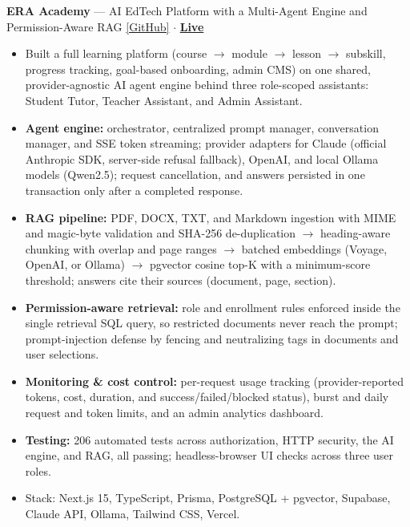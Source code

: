 \documentclass[11pt,a4paper]{article}
\begin{document}
\textbf{ERA Academy} --- AI EdTech Platform with a Multi-Agent Engine and Permission-Aware RAG \hfill \href{https://github.com/malikov-davronbek/ERA/tree/phase-1-foundation}{[GitHub]} $\cdot$ {\large\textbf{\href{https://era-academy.vercel.app}{Live}}}
\begin{itemize}
    \item Built a full learning platform (course $\rightarrow$ module $\rightarrow$ lesson $\rightarrow$ subskill, progress
tracking, goal-based onboarding, admin CMS) on one shared, provider-agnostic AI agent engine behind three
role-scoped assistants: Student Tutor, Teacher Assistant, and Admin Assistant.
    \item \textbf{Agent engine:} orchestrator, centralized prompt manager, conversation manager, and SSE token streaming;
provider adapters for Claude (official Anthropic SDK, server-side refusal fallback), OpenAI, and local Ollama models
(Qwen2.5); request cancellation, and answers persisted in one transaction only after a completed response.
    \item \textbf{RAG pipeline:} PDF, DOCX, TXT, and Markdown ingestion with MIME and magic-byte validation and SHA-256
de-duplication $\rightarrow$ heading-aware chunking with overlap and page ranges $\rightarrow$ batched embeddings
(Voyage, OpenAI, or Ollama) $\rightarrow$ pgvector cosine top-K with a minimum-score threshold; answers cite their
sources (document, page, section).
    \item \textbf{Permission-aware retrieval:} role and enrollment rules enforced inside the single retrieval SQL query, so
restricted documents never reach the prompt; prompt-injection defense by fencing and neutralizing tags in documents
and user selections.
    \item \textbf{Monitoring \& cost control:} per-request usage tracking (provider-reported tokens, cost, duration, and
success/failed/blocked status), burst and daily request and token limits, and an admin analytics dashboard.
    \item \textbf{Testing:} 206 automated tests across authorization, HTTP security, the AI engine, and RAG, all passing;
headless-browser UI checks across three user roles.
    \item Stack: Next.js 15, TypeScript, Prisma, PostgreSQL + pgvector, Supabase, Claude API, Ollama, Tailwind CSS, Vercel.
\end{itemize}

\medskip
\end{document}
